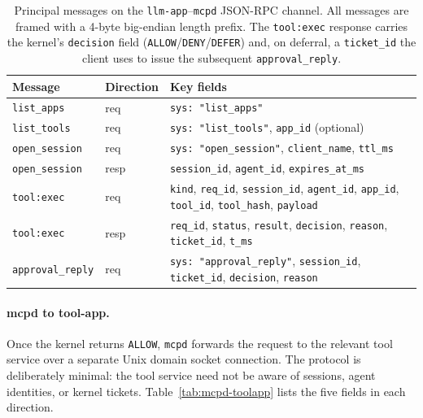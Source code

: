 \begin{table}[htbp]
\centering
\small
\setlength{\tabcolsep}{5pt}
\begin{tabular}{l l p{6.5cm}}
\toprule
\textbf{Message} & \textbf{Direction} & \textbf{Key fields} \\
\midrule
\texttt{list\_apps}       & req  & \texttt{sys: "list\_apps"} \\
\texttt{list\_tools}      & req  & \texttt{sys: "list\_tools"}, \texttt{app\_id} (optional) \\
\texttt{open\_session}    & req  & \texttt{sys: "open\_session"}, \texttt{client\_name}, \texttt{ttl\_ms} \\
\texttt{open\_session}    & resp & \texttt{session\_id}, \texttt{agent\_id}, \texttt{expires\_at\_ms} \\
\texttt{tool:exec}        & req  & \texttt{kind}, \texttt{req\_id}, \texttt{session\_id}, \texttt{agent\_id}, \texttt{app\_id}, \texttt{tool\_id}, \texttt{tool\_hash}, \texttt{payload} \\
\texttt{tool:exec}        & resp & \texttt{req\_id}, \texttt{status}, \texttt{result}, \texttt{decision}, \texttt{reason}, \texttt{ticket\_id}, \texttt{t\_ms} \\
\texttt{approval\_reply}  & req  & \texttt{sys: "approval\_reply"}, \texttt{session\_id}, \texttt{ticket\_id}, \texttt{decision}, \texttt{reason} \\
\bottomrule
\end{tabular}
\caption{Principal messages on the \texttt{llm-app}--\texttt{mcpd} JSON-RPC channel. All messages are framed with a 4-byte big-endian length prefix. The \texttt{tool:exec} response carries the kernel's \texttt{decision} field (\texttt{ALLOW}/\texttt{DENY}/\texttt{DEFER}) and, on deferral, a \texttt{ticket\_id} the client uses to issue the subsequent \texttt{approval\_reply}.}
\label{tab:llm-mcpd}
\end{table}

\paragraph{mcpd to tool-app.}
Once the kernel returns \texttt{ALLOW}, \texttt{mcpd} forwards the request to the relevant tool service over a separate Unix domain socket connection.
The protocol is deliberately minimal: the tool service need not be aware of sessions, agent identities, or kernel tickets.
Table~\ref{tab:mcpd-toolapp} lists the five fields in each direction.

